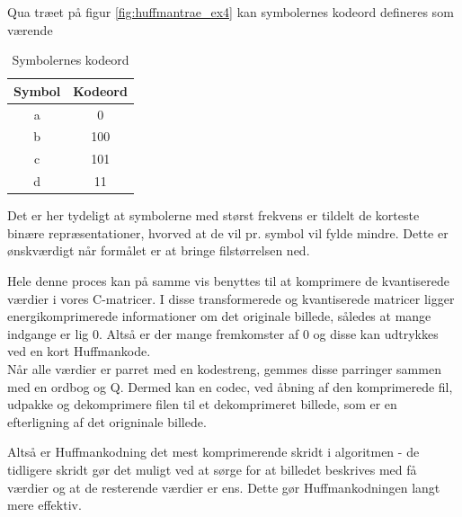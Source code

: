 Qua træet på figur \vref{fig:huffmantrae_ex4} kan symbolernes kodeord defineres som værende
\begin{table}[!h]
\centering
\begin{tabular}{|c|c|} 
\hline
\textbf{Symbol}	&	\textbf{Kodeord}	\\ \hline
a		&	0	\\ \hline
b		&	100	\\ \hline
c		&	101	\\ \hline
d		&	11	\\ \hline
\end{tabular}
\caption{Symbolernes kodeord}
\label{tb:huffman_ex}
\end{table}
Det er her tydeligt at symbolerne med størst frekvens er tildelt de korteste binære repræsentationer, hvorved at de vil pr. symbol vil fylde mindre. Dette er ønskværdigt når formålet er at bringe filstørrelsen ned.

Hele denne proces kan på samme vis benyttes til at komprimere de kvantiserede værdier i vores C-matricer. I disse transformerede og kvantiserede matricer ligger energikomprimerede informationer om det originale billede, således at mange indgange er lig 0. Altså er der mange fremkomster af 0 og disse kan udtrykkes ved en kort Huffmankode.\\
Når alle værdier er parret med en kodestreng, gemmes disse parringer sammen med en ordbog og Q. Dermed kan en codec, ved åbning af den komprimerede fil, udpakke og dekomprimere filen til et dekomprimeret billede, som er en efterligning af det origninale billede.

Altså er Huffmankodning det mest komprimerende skridt i algoritmen - de tidligere skridt gør det muligt ved at sørge for at billedet beskrives med få værdier og at de resterende værdier er ens. Dette gør Huffmankodningen langt mere effektiv.

%
